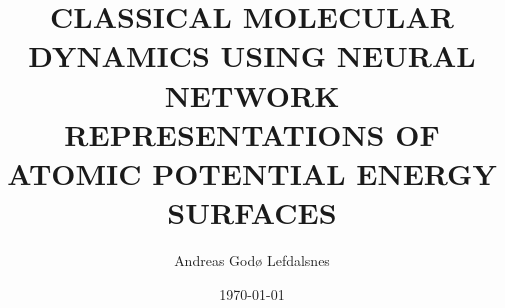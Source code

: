 \documentclass[twoside,english]{uiofysmaster}
\author{Andreas God{\o} Lefdalsnes}
\title{\uppercase{Classical molecular dynamics using neural network
representations of atomic potential energy surfaces}}
\date{\today}
\begin{document}
\begin{titlepage}
\maketitle
\end{titlepage}
\end{document}
